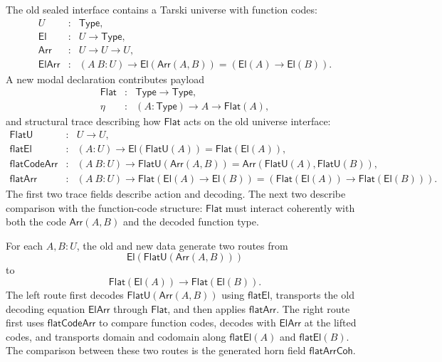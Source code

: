\documentclass{lmcs}
\begin{document}
The old sealed interface contains a Tarski universe with function codes:
\[
\begin{array}{rcl}
U &:& \mathsf{Type},\\
\mathsf{El} &:& U \to \mathsf{Type},\\
\mathsf{Arr} &:& U \to U \to U,\\
\mathsf{ElArr} &:& (A\ B:U) \to
  \mathsf{El}(\mathsf{Arr}(A,B)) = (\mathsf{El}(A) \to \mathsf{El}(B)).
\end{array}
\]
A new modal declaration contributes payload
\[
\begin{array}{rcl}
\mathsf{Flat} &:& \mathsf{Type}\to\mathsf{Type},\\
\eta &:& (A:\mathsf{Type})\to A\to\mathsf{Flat}(A),
\end{array}
\]
and structural trace describing how \(\mathsf{Flat}\) acts on the old universe interface:
\[
\begin{array}{rcl}
\mathsf{FlatU} &:& U\to U,\\
\mathsf{flatEl} &:& (A:U)\to
  \mathsf{El}(\mathsf{FlatU}(A)) = \mathsf{Flat}(\mathsf{El}(A)),\\
\mathsf{flatCodeArr} &:& (A\ B:U)\to
  \mathsf{FlatU}(\mathsf{Arr}(A,B)) =
  \mathsf{Arr}(\mathsf{FlatU}(A),\mathsf{FlatU}(B)),\\
\mathsf{flatArr} &:& (A\ B:U)\to
  \mathsf{Flat}(\mathsf{El}(A)\to\mathsf{El}(B)) =
  (\mathsf{Flat}(\mathsf{El}(A))\to\mathsf{Flat}(\mathsf{El}(B))).
\end{array}
\]
The first two trace fields describe action and decoding.  The next two describe comparison
with the function-code structure: \(\mathsf{Flat}\) must interact coherently with both the code
\(\mathsf{Arr}(A,B)\) and the decoded function type.

For each \(A,B:U\), the old and new data generate two routes from
\[
  \mathsf{El}(\mathsf{FlatU}(\mathsf{Arr}(A,B)))
\]
to
\[
  \mathsf{Flat}(\mathsf{El}(A))\to\mathsf{Flat}(\mathsf{El}(B)).
\]
The left route first decodes \(\mathsf{FlatU}(\mathsf{Arr}(A,B))\) using
\(\mathsf{flatEl}\), transports the old decoding equation \(\mathsf{ElArr}\) through
\(\mathsf{Flat}\), and then applies \(\mathsf{flatArr}\).  The right route first uses
\(\mathsf{flatCodeArr}\) to compare function codes, decodes with \(\mathsf{ElArr}\) at the
lifted codes, and transports domain and codomain along \(\mathsf{flatEl}(A)\) and
\(\mathsf{flatEl}(B)\).  The comparison between these two routes is the generated horn field
\(\mathsf{flatArrCoh}\).
\end{document}
